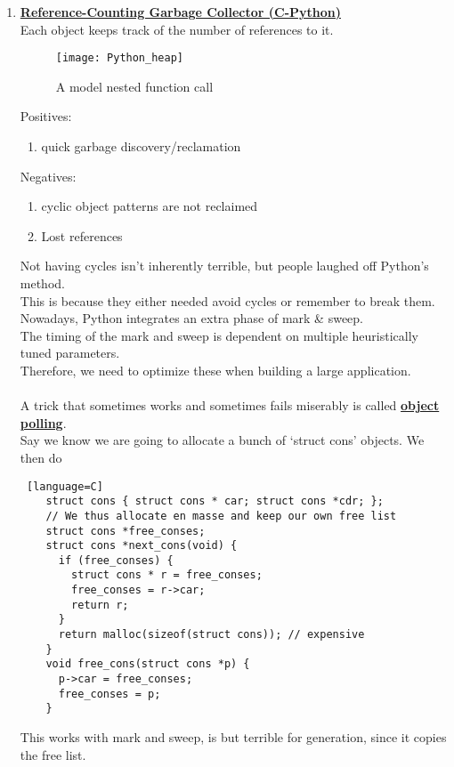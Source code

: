 \documentclass[../../lecture_notes.tex]{subfiles}
\begin{document}
\begin{enumerate} [itemsep=0mm]
	\item \textbf{\underline{Reference-Counting Garbage Collector (C-Python)}}\\
		Each object keeps track of the number of references to it.

		\begin{figure}[H]
			\centering
			\texttt{[image: Python\_heap]}
			\caption{A model nested function call}
			\label{fig:test}
		\end{figure}


		Positives:
			\begin{enumerate} [itemsep=0mm]
				\item quick garbage discovery/reclamation
			\end{enumerate}
		Negatives:
			\begin{enumerate} [itemsep=0mm]
				\item cyclic object patterns are not reclaimed
				\item Lost references
			\end{enumerate}

		Not having cycles isn’t inherently terrible, but people laughed off Python’s method.\\
		This is because they either needed avoid cycles or remember to break them.\\
		Nowadays, Python integrates an extra phase of mark \& sweep.\\
		The timing of the mark and sweep is dependent on multiple heuristically tuned parameters.\\
		Therefore, we need to optimize these when building a large application.\\
\\
		A trick that sometimes works and sometimes fails miserably is called \textbf{\underline{object polling}}.\\
		Say we know we are going to allocate a bunch of ‘struct cons’ objects. We then do\\
		\begin{lstlisting} [language=C]
	struct cons { struct cons * car; struct cons *cdr; }; 
	// We thus allocate en masse and keep our own free list
	struct cons *free_conses;
	struct cons *next_cons(void) {
	  if (free_conses) {
	    struct cons * r = free_conses;
	    free_conses = r->car;
	    return r;
	  }
	  return malloc(sizeof(struct cons)); // expensive
	}
	void free_cons(struct cons *p) {
	  p->car = free_conses;
	  free_conses = p;
	}
		\end{lstlisting}
    This works with mark and sweep, is but terrible for generation, since it copies the free list.
\end{enumerate}
\end{document}
